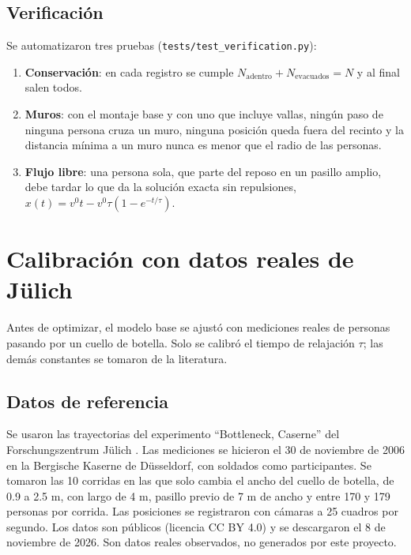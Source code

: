 \documentclass[11pt,letterpaper]{article}
\begin{document}
\subsection{Verificación}
Se automatizaron tres pruebas (\texttt{tests/test\_verification.py}):
\begin{enumerate}
\item \textbf{Conservación}: en cada registro se cumple $N_{\text{adentro}} + N_{\text{evacuados}} = N$ y al final salen todos.
\item \textbf{Muros}: con el montaje base y con uno que incluye vallas, ningún paso de ninguna persona cruza un muro, ninguna posición queda fuera del recinto y la distancia mínima a un muro nunca es menor que el radio de las personas.
\item \textbf{Flujo libre}: una persona sola, que parte del reposo en un pasillo amplio, debe tardar lo que da la solución exacta sin repulsiones, $x(t) = v^0 t - v^0 \tau (1 - e^{-t/\tau})$.
\end{enumerate}

\begin{table}[H]
\centering
\caption{Resultados de las pruebas de verificación.}
\label{tab:verificacion}

\end{table}

\section{Calibración con datos reales de Jülich}

Antes de optimizar, el modelo base se ajustó con mediciones reales de personas pasando por un cuello de botella. Solo se calibró el tiempo de relajación $\tau$; las demás constantes se tomaron de la literatura.

\subsection{Datos de referencia}
Se usaron las trayectorias del experimento ``Bottleneck, Caserne'' del Forschungszentrum Jülich \citep{julich2006}. Las mediciones se hicieron el 30 de noviembre de 2006 en la Bergische Kaserne de Düsseldorf, con soldados como participantes. Se tomaron las 10 corridas en las que solo cambia el ancho del cuello de botella, de 0.9 a 2.5 m, con largo de 4 m, pasillo previo de 7 m de ancho y entre 170 y 179 personas por corrida. Las posiciones se registraron con cámaras a 25 cuadros por segundo. Los datos son públicos (licencia CC BY 4.0) y se descargaron el 8 de noviembre de 2026. Son datos reales observados, no generados por este proyecto.
\end{document}

